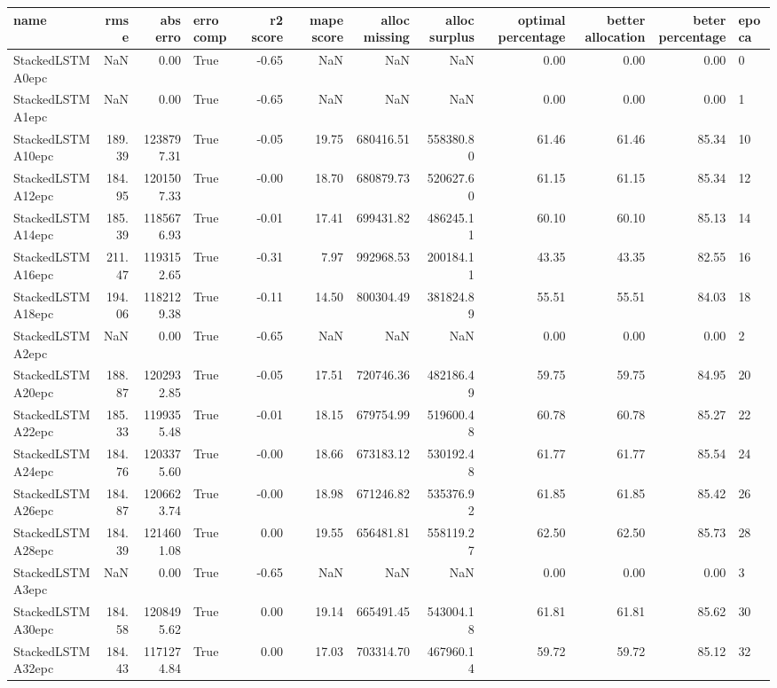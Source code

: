 \begin{tabular}{lrrlrrrrrrrl}
\toprule
name & rmse & abs erro & erro comp & r2 score & mape score & alloc missing & alloc surplus & optimal percentage & better allocation & beter percentage & epoca \\
\midrule
StackedLSTMA0epc & NaN & 0.00 & True & -0.65 & NaN & NaN & NaN & 0.00 & 0.00 & 0.00 & 0 \\
StackedLSTMA1epc & NaN & 0.00 & True & -0.65 & NaN & NaN & NaN & 0.00 & 0.00 & 0.00 & 1 \\
StackedLSTMA10epc & 189.39 & 1238797.31 & True & -0.05 & 19.75 & 680416.51 & 558380.80 & 61.46 & 61.46 & 85.34 & 10 \\
StackedLSTMA12epc & 184.95 & 1201507.33 & True & -0.00 & 18.70 & 680879.73 & 520627.60 & 61.15 & 61.15 & 85.34 & 12 \\
StackedLSTMA14epc & 185.39 & 1185676.93 & True & -0.01 & 17.41 & 699431.82 & 486245.11 & 60.10 & 60.10 & 85.13 & 14 \\
StackedLSTMA16epc & 211.47 & 1193152.65 & True & -0.31 & 7.97 & 992968.53 & 200184.11 & 43.35 & 43.35 & 82.55 & 16 \\
StackedLSTMA18epc & 194.06 & 1182129.38 & True & -0.11 & 14.50 & 800304.49 & 381824.89 & 55.51 & 55.51 & 84.03 & 18 \\
StackedLSTMA2epc & NaN & 0.00 & True & -0.65 & NaN & NaN & NaN & 0.00 & 0.00 & 0.00 & 2 \\
StackedLSTMA20epc & 188.87 & 1202932.85 & True & -0.05 & 17.51 & 720746.36 & 482186.49 & 59.75 & 59.75 & 84.95 & 20 \\
StackedLSTMA22epc & 185.33 & 1199355.48 & True & -0.01 & 18.15 & 679754.99 & 519600.48 & 60.78 & 60.78 & 85.27 & 22 \\
StackedLSTMA24epc & 184.76 & 1203375.60 & True & -0.00 & 18.66 & 673183.12 & 530192.48 & 61.77 & 61.77 & 85.54 & 24 \\
StackedLSTMA26epc & 184.87 & 1206623.74 & True & -0.00 & 18.98 & 671246.82 & 535376.92 & 61.85 & 61.85 & 85.42 & 26 \\
StackedLSTMA28epc & 184.39 & 1214601.08 & True & 0.00 & 19.55 & 656481.81 & 558119.27 & 62.50 & 62.50 & 85.73 & 28 \\
StackedLSTMA3epc & NaN & 0.00 & True & -0.65 & NaN & NaN & NaN & 0.00 & 0.00 & 0.00 & 3 \\
StackedLSTMA30epc & 184.58 & 1208495.62 & True & 0.00 & 19.14 & 665491.45 & 543004.18 & 61.81 & 61.81 & 85.62 & 30 \\
StackedLSTMA32epc & 184.43 & 1171274.84 & True & 0.00 & 17.03 & 703314.70 & 467960.14 & 59.72 & 59.72 & 85.12 & 32 \\

\end{tabular}
